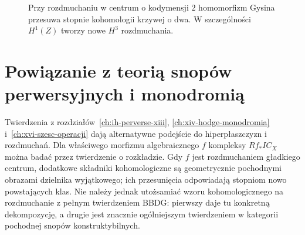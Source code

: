 \begin{figure}[htbp]
\centering
{}
\caption{Przy rozdmuchaniu w centrum o kodymensji $2$
homomorfizm Gysina przesuwa stopnie kohomologii krzywej
o dwa. W szczególności $H^1(Z)$ tworzy nowe $H^3$ rozdmuchania.}
\label{fig:xvii-elliptic-blowup-audit}
\end{figure}

\section{Powiązanie z teorią snopów perwersyjnych i monodromią}
Twierdzenia z rozdziałów~\ref{ch:ih-perverse-xiii},
\ref{ch:xiv-hodge-monodromia} i~\ref{ch:xvi-szesc-operacji}
dają alternatywne podejście do hiperpłaszczyzn i rozdmuchań.
Dla właściwego morfizmu algebraicznego $f$ kompleksy $Rf_*IC_X$
można badać przez twierdzenie o rozkładzie.
Gdy $f$ jest rozdmuchaniem gładkiego centrum,
dodatkowe składniki kohomologiczne są geometrycznie
pochodnymi obrazami dzielnika wyjątkowego; ich przesunięcia
odpowiadają stopniom nowo powstających klas.
Nie należy jednak utożsamiać wzoru kohomologicznego
na rozdmuchanie z pełnym twierdzeniem BBDG:
pierwszy daje tu konkretną dekompozycję,
a drugie jest znacznie ogólniejszym twierdzeniem
w kategorii pochodnej snopów konstruktybilnych.

